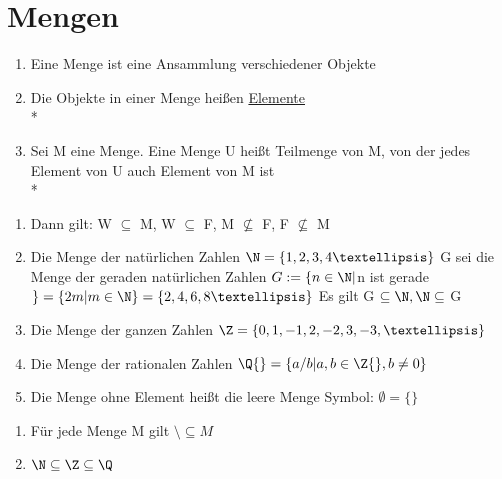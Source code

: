 \chapter{Mengen}
\begin{enumerate}
\item Eine Menge ist eine Ansammlung verschiedener Objekte
\item Die Objekte in einer Menge heißen \ul{Elemente}\\*
%
%
\item Sei M eine Menge. Eine Menge U heißt Teilmenge von M, von der jedes Element von U auch Element von M ist\\*
%
\end{enumerate}
%
\begin{enumerate}
\item {
Dann gilt: W $\subseteq$ M, W $\subseteq$ F, M ${\not\subseteq}$ F, F ${\not\subseteq}$ M}
\item {Die Menge der natürlichen Zahlen
$\N = \{1,2,3,4 …\}$
G sei die Menge der geraden natürlichen Zahlen
$G := \{n \in \N | $n ist gerade$\} = \{2m | m \in \N\} = \{2,4,6,8 …\}$
Es gilt G $\subseteq \N, \N \subseteq$ G}
\item {Die Menge der ganzen Zahlen
$\Z = \{0,1,-1,2,-2,3,-3, …\}$}
\item {Die Menge der rationalen Zahlen
$\Q{} = \{a/b | a, b \in \Z{}, b \neq 0\}$}
\item {Die Menge ohne Element heißt die leere Menge
Symbol: $\emptyset = \{\}$}
\end{enumerate}
%
\bem
\begin{enumerate}
\item Für jede Menge M gilt $\setminus \subseteq M$
\item $\N \subseteq \Z \subseteq \Q$
\end{enumerate}

